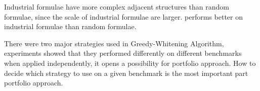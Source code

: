 Industrial formulae have more complex adjacent structures than random formulae, since the scale of industrial formulae are larger. \tool performs better on industrial formulae than random formulae.

There were two major strategies used in Greedy-Whitening Algorithm, experiments showed that they performed differently on different benchmarks when applied independently, it opens a possibility for portfolio approach. How to decide which strategy to use on a given benchmark is the most important part portfolio approach.

